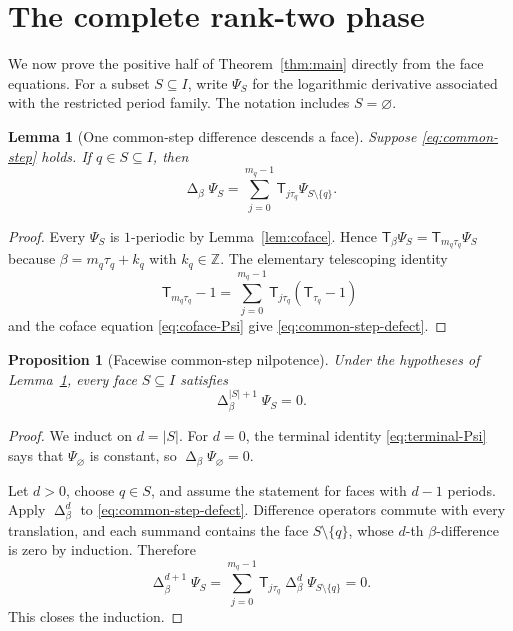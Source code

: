 \documentclass[11pt]{article}
\numberwithin{equation}{section}
\newtheorem{proposition}[theorem]{Proposition}
\newtheorem{lemma}[theorem]{Lemma}
\theoremstyle{definition}
\theoremstyle{remark}
\newcommand{\Z}{\mathbb Z}
\newcommand{\T}{\mathsf T}
\newcommand{\Deltaop}{\mathop{\Delta}}
\begin{document}
\section{The complete rank-two phase}
\label{sec:low}

We now prove the positive half of Theorem~\ref{thm:main} directly from the
face equations.  For a subset $S\subseteq I$, write $\Psi_S$ for the
logarithmic derivative associated with the restricted period family.  The
notation includes $S=\varnothing$.

\begin{lemma}[One common-step difference descends a face]
\label{lem:common-step-defect}
Suppose \eqref{eq:common-step} holds.  If $q\in S\subseteq I$, then
\begin{equation}
 \Deltaop_\beta\Psi_S
 =\sum_{j=0}^{m_q-1}\T_{j\tau_q}\Psi_{S\setminus\{q\}}.
 \label{eq:common-step-defect}
\end{equation}
\end{lemma}

\begin{proof}
Every $\Psi_S$ is $1$-periodic by Lemma~\ref{lem:coface}.  Hence
$\T_\beta\Psi_S=\T_{m_q\tau_q}\Psi_S$ because
$\beta=m_q\tau_q+k_q$ with $k_q\in\Z$.  The elementary telescoping identity
\[
 \T_{m_q\tau_q}-1
 =\sum_{j=0}^{m_q-1}\T_{j\tau_q}(\T_{\tau_q}-1)
\]
and the coface equation \eqref{eq:coface-Psi} give
\eqref{eq:common-step-defect}.
\end{proof}

\begin{proposition}[Facewise common-step nilpotence]
\label{prop:nilpotence}
Under the hypotheses of Lemma~\ref{lem:common-step-defect}, every face
$S\subseteq I$ satisfies
\begin{equation}
 \Deltaop_\beta^{|S|+1}\Psi_S=0.
 \label{eq:nilpotence}
\end{equation}
\end{proposition}

\begin{proof}
We induct on $d=|S|$.  For $d=0$, the terminal identity
\eqref{eq:terminal-Psi} says that $\Psi_\varnothing$ is constant, so
$\Deltaop_\beta\Psi_\varnothing=0$.

Let $d>0$, choose $q\in S$, and assume the statement for faces with
$d-1$ periods.  Apply $\Deltaop_\beta^d$ to
\eqref{eq:common-step-defect}.  Difference operators commute with every
translation, and each summand contains the face $S\setminus\{q\}$, whose
$d$-th $\beta$-difference is zero by induction.  Therefore
\[
 \Deltaop_\beta^{d+1}\Psi_S
 =\sum_{j=0}^{m_q-1}\T_{j\tau_q}
   \Deltaop_\beta^d\Psi_{S\setminus\{q\}}=0.
\]
This closes the induction.
\end{proof}
\end{document}
